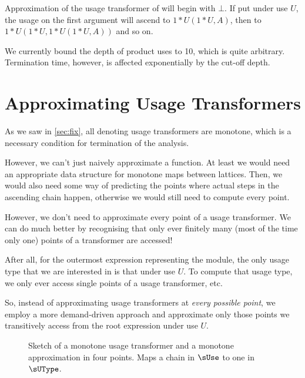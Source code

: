 Approximation of the usage transformer of  will begin with $\bot$. If put under use $U$, the usage on the first argument will ascend to $1*U(1*U, A)$, then to $1*U(1*U, 1*U(1*U, A))$ and so on.

We currently bound the depth of product uses to 10, which is quite arbitrary. 
Termination time, however, is affected exponentially by the cut-off depth.

\section{Approximating Usage Transformers}\label{sec:approx}

As we saw in \cref{sec:fix}, all denoting usage transformers are monotone, which is a necessary condition for termination of the analysis.

However, we can't just naively approximate a function.
At least we would need an appropriate data structure for monotone maps between lattices.
Then, we would also need some way of predicting the points where actual steps in the ascending chain happen, otherwise we would still need to compute every point.

However, we don't need to approximate every point of a usage transformer.
We can do much better by recognising that only ever finitely many (most of the time only one) points of a transformer are accessed!

After all, for the outermost  expression representing the module, the only usage type that we are interested in is that under use $U$.
To compute that usage type, we only ever access single points of a usage transformer, etc.

So, instead of approximating usage transformers at \emph{every possible point}, we employ a more demand-driven approach and approximate only those points we transitively access from the root expression under use $U$.

\begin{figure}[h]
  \centering
  \caption{Sketch of a monotone usage transformer and a monotone approximation in four points. Maps a chain in $\sUse$ to one in $\sUType$.}
  \label{fig:approx}
\end{figure}

